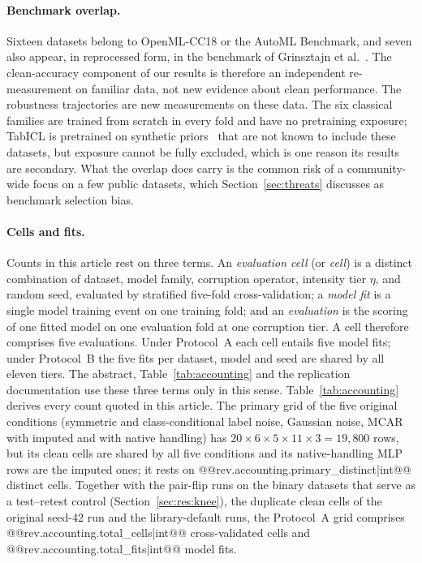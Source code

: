 \documentclass[pdflatex,sn-mathphys]{sn-jnl}
\theoremstyle{thmstyleone}
\theoremstyle{thmstyletwo}
\theoremstyle{thmstylethree}
\begin{document}
\paragraph{Benchmark overlap.} Sixteen datasets belong to OpenML-CC18 or the AutoML Benchmark, and seven also appear, in reprocessed form, in the benchmark of Grinsztajn et al.~\cite{grinsztajn2022tree}. The clean-accuracy component of our results is therefore an independent re-measurement on familiar data, not new evidence about clean performance. The robustness trajectories are new measurements on these data. The six classical families are trained from scratch in every fold and have no pretraining exposure; TabICL is pretrained on synthetic priors~\cite{qu2025tabicl} that are not known to include these datasets, but exposure cannot be fully excluded, which is one reason its results are secondary. What the overlap does carry is the common risk of a community-wide focus on a few public datasets, which Section~\ref{sec:threats} discusses as benchmark selection bias.

\paragraph{Cells and fits.} Counts in this article rest on three terms. An \emph{evaluation cell} (or \emph{cell}) is a distinct combination of dataset, model family, corruption operator, intensity tier $\eta$, and random seed, evaluated by stratified five-fold cross-validation; a \emph{model fit} is a single model training event on one training fold; and an \emph{evaluation} is the scoring of one fitted model on one evaluation fold at one corruption tier. A cell therefore comprises five evaluations. Under Protocol~A each cell entails five model fits; under Protocol~B the five fits per dataset, model and seed are shared by all eleven tiers. The abstract, Table~\ref{tab:accounting} and the replication documentation use these three terms only in this sense. Table~\ref{tab:accounting} derives every count quoted in this article. The primary grid of the five original conditions (symmetric and class-conditional label noise, Gaussian noise, MCAR with imputed and with native handling) has $20\times6\times5\times11\times3=19{,}800$ rows, but its clean cells are shared by all five conditions and its native-handling MLP rows are the imputed ones; it rests on @@{rev.accounting.primary_distinct|int}@@ distinct cells. Together with the pair-flip runs on the binary datasets that serve as a test--retest control (Section~\ref{sec:res:knee}), the duplicate clean cells of the original seed-42 run and the library-default runs, the Protocol~A grid comprises @@{rev.accounting.total_cells|int}@@ cross-validated cells and @@{rev.accounting.total_fits|int}@@ model fits.
\end{document}
